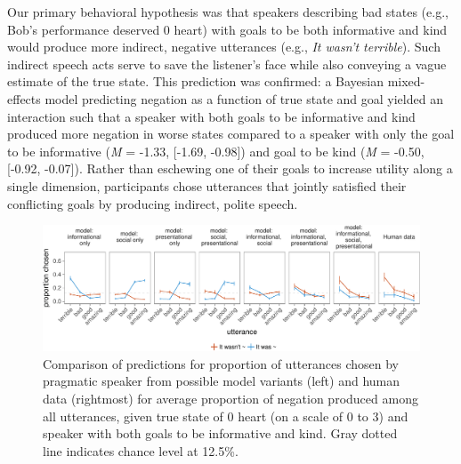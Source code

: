 \documentclass[9pt,twocolumn,twoside,lineno]{main_class_file}
\begin{document}
Our primary behavioral hypothesis was that speakers describing bad
states (e.g., Bob's performance deserved 0 heart) with goals to be both
informative and kind would produce more indirect, negative utterances
(e.g., \emph{It wasn't terrible}). Such indirect speech acts serve to
save the listener's face while also conveying a vague estimate of the
true state. This prediction was confirmed: a Bayesian mixed-effects
model predicting negation as a function of true state and goal yielded
an interaction such that a speaker with both goals to be informative and
kind produced more negation in worse states compared to a speaker with
only the goal to be informative (\emph{M} = -1.33, {[}-1.69, -0.98{]})
and goal to be kind (\emph{M} = -0.50, {[}-0.92, -0.07{]}). Rather than
eschewing one of their goals to increase utility along a single
dimension, participants chose utterances that jointly satisfied their
conflicting goals by producing indirect, polite speech.

\begin{figure}[!h]
\includegraphics[width=\textwidth]{fig/comparison-1} \caption{Comparison of predictions for proportion of utterances chosen by pragmatic speaker from possible model variants (left) and human data (rightmost) for average proportion of negation produced among all utterances, given true state of 0 heart (on a scale of 0 to 3) and speaker with both goals to be informative and kind. Gray dotted line indicates chance level at 12.5\%.}\label{fig:comparison}
\end{figure}
\end{document}
